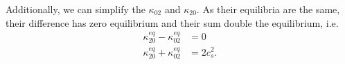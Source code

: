 Additionally, we can simplify the $\kappa_{02}$ and $\kappa_{20}$.
As their equilibria are the same, their difference has zero equilibrium and their sum double the equilibrium, i.e.
\begin{equation}
  \label{eq: altered cumulants 20 and 02}
  \begin{aligned}
    \kappa_{20}^{eq} - \kappa_{02}^{eq} & = 0  \\
    \kappa_{20}^{eq} + \kappa_{02}^{eq} & = 2 c_s^2.
  \end{aligned}
\end{equation}
